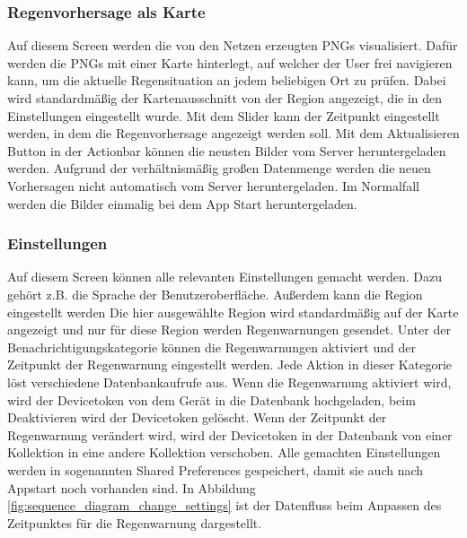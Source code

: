 \subsubsection*{Regenvorhersage als Karte}
Auf diesem Screen werden die von den Netzen erzeugten PNGs visualisiert. 
Dafür werden die PNGs mit einer Karte hinterlegt, auf welcher der User frei navigieren kann, 
um die aktuelle Regensituation an jedem beliebigen Ort zu prüfen. 
Dabei wird standardmäßig der Kartenausschnitt von der Region angezeigt, die in den Einstellungen eingestellt wurde. 
Mit dem Slider kann der Zeitpunkt eingestellt werden, in dem die Regenvorhersage angezeigt werden soll. 
Mit dem Aktualisieren Button in der Actionbar können die neusten Bilder vom Server heruntergeladen werden. 
Aufgrund der verhältnismäßig großen Datenmenge werden die neuen Vorhersagen nicht automatisch vom Server heruntergeladen. 
Im Normalfall werden die Bilder einmalig bei dem App Start heruntergeladen.

\subsubsection*{Einstellungen}
Auf diesem Screen können alle relevanten Einstellungen gemacht werden. Dazu gehört z.B. die Sprache der Benutzeroberfläche. 
Außerdem kann die Region eingestellt werden 
Die hier ausgewählte Region wird standardmäßig auf der Karte angezeigt und nur für diese Region werden Regenwarnungen gesendet. 
Unter der Benachrichtigungskategorie können die Regenwarnungen aktiviert und der Zeitpunkt der Regenwarnung eingestellt werden. 
Jede Aktion in dieser Kategorie löst verschiedene Datenbankaufrufe aus. 
Wenn die Regenwarnung aktiviert wird, wird der Devicetoken von dem Gerät in die Datenbank hochgeladen, beim Deaktivieren wird der Devicetoken gelöscht. 
Wenn der Zeitpunkt der Regenwarnung verändert wird, wird der Devicetoken in der Datenbank von einer Kollektion in eine andere Kollektion verschoben.   
Alle gemachten Einstellungen werden in sogenannten Shared Preferences gespeichert, damit sie auch nach Appstart noch vorhanden sind.   
In Abbildung \ref*{fig:sequence_diagram_change_settings} ist der Datenfluss beim Anpassen des Zeitpunktes für die Regenwarnung 
dargestellt. 

